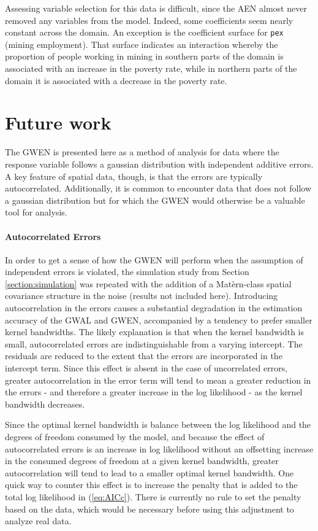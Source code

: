 \documentclass[authoryear, review, 11pt]{elsarticle}
\begin{document}
	Assessing variable selection for this data is difficult, since the AEN almost never removed any variables from the model. Indeed, some coefficients seem nearly constant across the domain. An exception is the coefficient surface for \verb!pex! (mining employment). That surface indicates an interaction whereby the proportion of people working in mining in southern parts of the domain is associated with an increase in the poverty rate, while in northern parts of the domain it is associated with a decrease in the poverty rate.


\section{Future work \label{section:future-work}}
	The GWEN is presented here as a method of analysis for data where the response variable follows a gaussian distribution with independent additive errors. A key feature of spatial data, though, is that the errors are typically autocorrelated. Additionally, it is common to encounter data that does not follow a gaussian distribution but for which the GWEN would otherwise be a valuable tool for analysis.

	\paragraph{Autocorrelated Errors} In order to get a sense of how the GWEN will perform when the assumption of independent errors is violated, the simulation study from Section \ref{section:simulation} was repeated with the addition of a Mat\`{e}rn-class spatial covariance structure in the noise (results not included here). Introducing autocorrelation in the errors causes a substantial degradation in the estimation accuracy of the GWAL and GWEN, accompanied by a tendency to prefer smaller kernel bandwidths. The likely explanation is that when the kernel bandwidth is small, autocorrelated errors are indistinguishable from a varying intercept. The residuals are reduced to the extent that the errors are incorporated in the intercept term. Since this effect is absent in the case of uncorrelated errors, greater autocorrelation in the error term will tend to mean a greater reduction in the errors - and therefore a greater increase in the log likelihood - as the kernel bandwidth decreases.
	
	Since the optimal kernel bandwidth is balance between the log likelihood and the degrees of freedom consumed by the model, and because the effect of autocorrelated errors is an increase in log likelihood without an offsetting increase in the consumed degrees of freedom at a given kernel bandwidth, greater autocorrelation will tend to lead to a smaller optimal kernel bandwidth. One quick way to counter this effect is to increase the penalty that is added to the total log likelihood in (\ref{eq:AICc}). There is currently no rule to set the penalty based on the data, which would be necessary before using this adjustment to analyze real data.
	
\end{document}
